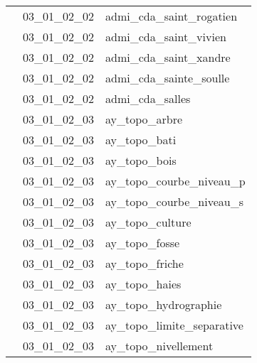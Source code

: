 \documentclass[12pt,titlepage]{book}
\begin{document}
\begin{supertabular}{|p{10cm}|c|p{15cm}|}
                    & 03\_01\_02\_02 & admi\_cda\_saint\_rogatien\\


                    & 03\_01\_02\_02 & admi\_cda\_saint\_vivien\\


                    & 03\_01\_02\_02 & admi\_cda\_saint\_xandre\\


                    & 03\_01\_02\_02 & admi\_cda\_sainte\_soulle\\


                    & 03\_01\_02\_02 & admi\_cda\_salles\\


                    & 03\_01\_02\_03 & ay\_topo\_arbre\\


                    & 03\_01\_02\_03 & ay\_topo\_bati\\


                    & 03\_01\_02\_03 & ay\_topo\_bois\\


                    & 03\_01\_02\_03 & ay\_topo\_courbe\_niveau\_p\\


                    & 03\_01\_02\_03 & ay\_topo\_courbe\_niveau\_s\\


                    & 03\_01\_02\_03 & ay\_topo\_culture\\


                    & 03\_01\_02\_03 & ay\_topo\_fosse\\


                    & 03\_01\_02\_03 & ay\_topo\_friche\\


                    & 03\_01\_02\_03 & ay\_topo\_haies\\


                    & 03\_01\_02\_03 & ay\_topo\_hydrographie\\


                    & 03\_01\_02\_03 & ay\_topo\_limite\_separative\\


                    & 03\_01\_02\_03 & ay\_topo\_nivellement\\



\end{supertabular}
\end{document}
